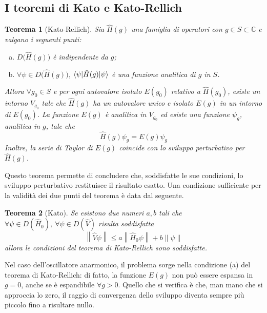 \documentclass[10pt, a4paper]{scrartcl} %
\numberwithin{equation}{section}
\theoremstyle{style2}
\theoremstyle{style1}
\newtheorem{teorema}{Teorema}[section]
\begin{document}
\subsection{I teoremi di Kato e Kato-Rellich}
\begin{teorema}
	[Kato-Rellich]
Sia $\hat{H} (g) $ una famiglia di operatori con $g \in S \subset  \mathbb{C}$ e valgano i seguenti punti:
\begin{enumerate}[(a).]
	\item $D\big(\hat{H}(g)\big)$ \`e indipendente da $g$;
	\item $\forall \psi  \in D\big(\hat{H}(g)\big)$, $\braket{\psi |\hat{H}(g)|\psi } $ \`e una funzione analitica di $g$ in $S$.
\end{enumerate}
Allora $\forall g_0 \in S$ e per ogni autovalore isolato $E(g_0)$ relativo a $\hat{H}(g_0)$, esiste un intorno $V_{g_0} $ tale che $\hat{H}(g)$ ha un autovalore unico e isolato $E(g)$ in un intorno di $E(g_0)$.
La funzione $E(g)$ \`e analitica in $V_{g_0} $ ed esiste una funzione $\psi _g$, analitica in $g$, tale che
\[
\hat{H}(g) \psi _g = E(g) \psi _g
\] 
Inoltre, la serie di Taylor di $E(g)$ coincide con lo sviluppo perturbativo per $\hat{H}(g)$.
\end{teorema}
Questo teorema permette di concludere che, soddisfatte le sue condizioni, lo sviluppo perturbativo restituisce il risultato esatto.
Una condizione sufficiente per la validit\`a dei due punti del teorema \`e data dal seguente.
\begin{teorema}
	[Kato]
	Se esistono due numeri $a,b$ tali che $\forall \psi \in D(\hat{H}_0), \ \forall \psi \in D(\hat{V})$ risulta soddisfatta 
	\begin{equation}
		\left\lVert \hat{V}\psi  \right\rVert \le a \left\lVert \hat{H}_0 \psi  \right\rVert + b \left\lVert \psi  \right\rVert 
	\end{equation}
	allora le condizioni del teorema di Kato-Rellich sono soddisfatte.
\end{teorema}
Nel caso dell'oscillatore anarmonico, il problema sorge nella condizione (a) del teorema di Kato-Rellich: di fatto, la funzione $E(g)$ non pu\`o essere espansa in $g=0$, anche se \`e espandibile $\forall g > 0$.
Quello che si verifica \`e che, man mano che si approccia lo zero, il raggio di convergenza dello sviluppo diventa sempre pi\`u piccolo fino a risultare nullo.
\end{document}
